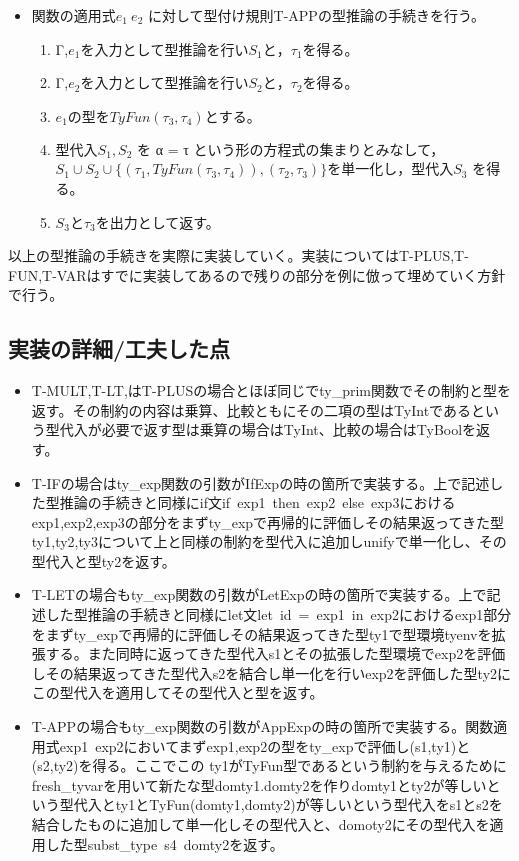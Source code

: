 \documentclass[a4paper,11pt,oneside,openany]{jsarticle}
\begin{document}
  \begin{itemize}
    \item 関数の適用式$e_1\ e_2$ に対して型付け規則T-APPの型推論の手続きを行う。
    \begin{enumerate}
      \item Γ,$e_1を入力として型推論を行いS_1と，τ_1$を得る。
      \item Γ,$e_2を入力として型推論を行いS_2と，τ_2$を得る。
      \item $e_1の型をTyFun(τ_3,τ_4)とする。$
      \item 型代入$S_1,S_2$ を α = τ という形の方程式の集まりとみなして，$S_1∪S_2∪\{(τ_1,TyFun(τ_3,τ_4)),(τ_2,τ_3)\}  を単一化し，型代入S_3$ を得る。
      \item $S_3とτ_3$を出力として返す。
    \end{enumerate}
  \end{itemize}
  以上の型推論の手続きを実際に実装していく。実装についてはT-PLUS,T-FUN,T-VARはすでに実装してあるので残りの部分を例に倣って埋めていく方針で行う。
\subsection{実装の詳細/工夫した点}
  \begin{itemize}
    \item T-MULT,T-LT,はT-PLUSの場合とほぼ同じでty\_prim関数でその制約と型を返す。その制約の内容は乗算、比較ともにその二項の型はTyIntであるという型代入が必要で返す型は乗算の場合はTyInt、比較の場合はTyBoolを返す。
    \item T-IFの場合はty\_exp関数の引数がIfExpの時の箇所で実装する。上で記述した型推論の手続きと同様にif文if\ exp1\ then\ exp2\ else\ exp3におけるexp1,exp2,exp3の部分をまずty\_expで再帰的に評価しその結果返ってきた型ty1,ty2,ty3について上と同様の制約を型代入に追加しunifyで単一化し、その型代入と型ty2を返す。
    \item T-LETの場合もty\_exp関数の引数がLetExpの時の箇所で実装する。上で記述した型推論の手続きと同様にlet文let\ id\ =\ exp1\ in\ exp2におけるexp1部分をまずty\_expで再帰的に評価しその結果返ってきた型ty1で型環境tyenvを拡張する。また同時に返ってきた型代入s1とその拡張した型環境でexp2を評価しその結果返ってきた型代入s2を結合し単一化を行いexp2を評価した型ty2にこの型代入を適用してその型代入と型を返す。
    \item T-APPの場合もty\_exp関数の引数がAppExpの時の箇所で実装する。関数適用式exp1\ exp2においてまずexp1,exp2の型をty\_expで評価し(s1,ty1)と(s2,ty2)を得る。ここでこの ty1がTyFun型であるという制約を与えるためにfresh\_tyvarを用いて新たな型domty1.domty2を作りdomty1とty2が等しいという型代入とty1とTyFun(domty1,domty2)が等しいという型代入をs1とs2を結合したものに追加して単一化しその型代入と、domoty2にその型代入を適用した型subst\_type\ s4\ domty2を返す。\\\\
  \end{itemize}
\end{document}
